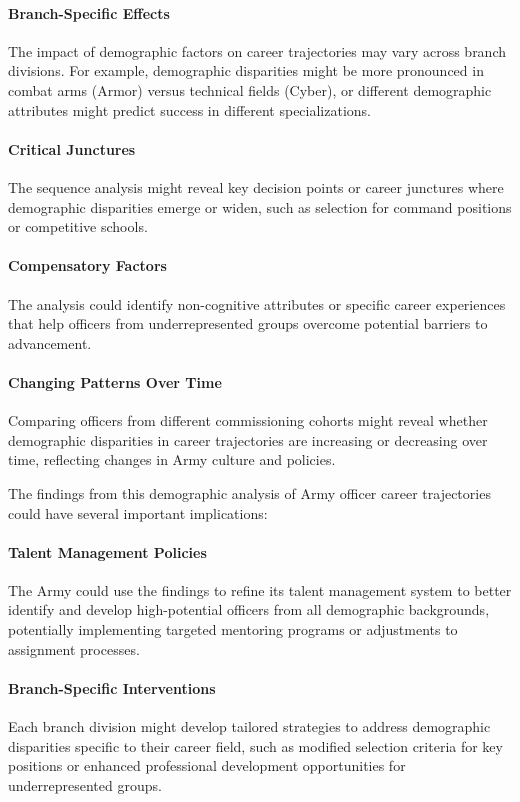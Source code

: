 \documentclass[../main.tex]{subfiles}
\begin{document}
\paragraph{Branch-Specific Effects} The impact of demographic factors on career trajectories may vary across branch divisions. For example, demographic disparities might be more pronounced in combat arms (Armor) versus technical fields (Cyber), or different demographic attributes might predict success in different specializations.

\paragraph{Critical Junctures} The sequence analysis might reveal key decision points or career junctures where demographic disparities emerge or widen, such as selection for command positions or competitive schools.

\paragraph{Compensatory Factors} The analysis could identify non-cognitive attributes or specific career experiences that help officers from underrepresented groups overcome potential barriers to advancement.

\paragraph{Changing Patterns Over Time} Comparing officers from different commissioning cohorts might reveal whether demographic disparities in career trajectories are increasing or decreasing over time, reflecting changes in Army culture and policies.


 The findings from this demographic analysis of Army officer career trajectories could have several important implications:

\paragraph{Talent Management Policies} The Army could use the findings to refine its talent management system to better identify and develop high-potential officers from all demographic backgrounds, potentially implementing targeted mentoring programs or adjustments to assignment processes.

\paragraph{Branch-Specific Interventions} Each branch division might develop tailored strategies to address demographic disparities specific to their career field, such as modified selection criteria for key positions or enhanced professional development opportunities for underrepresented groups.
\end{document}
